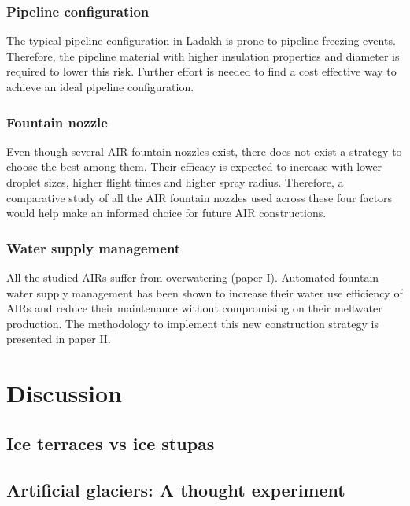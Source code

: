 \subsubsection{Pipeline configuration}

The typical pipeline configuration in Ladakh is prone to pipeline freezing events. Therefore, the pipeline
material with higher insulation properties and diameter is required to lower this risk. Further effort is needed
to find a cost effective way to achieve an ideal pipeline configuration.

\subsubsection{Fountain nozzle}

Even though several AIR fountain nozzles exist, there does not exist a strategy to choose the best among them.
Their efficacy is expected to increase with lower droplet sizes, higher flight times and higher spray radius.
Therefore, a comparative study of all the AIR fountain nozzles used across these four factors would help make an
informed choice for future AIR constructions.

\subsubsection{Water supply management}

All the studied AIRs suffer from overwatering (paper I). Automated fountain water supply management has been
shown to increase their water use efficiency of AIRs and reduce their maintenance without compromising on their
meltwater production. The methodology to implement this new construction strategy is presented in paper II.


\section{Discussion}

\subsection{Ice terraces vs ice stupas}

\subsection{Artificial glaciers: A thought experiment}




